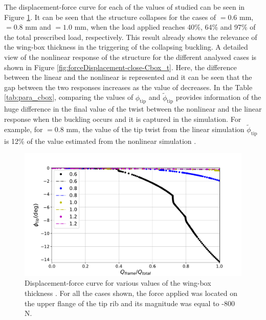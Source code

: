     The displacement-force curve for each of the values of \boxt studied can be seen in Figure \ref{fig:forceDisplacement-far-Cbox_t}. It can be seen that the structure collapses for the cases of \boxt$= 0.6$ mm, \boxt$= 0.8$ mm and \boxt$= 1.0$ mm, when the load applied reaches 40\%, 64\% and 97\% of the total prescribed load, respectively. This result already shows the relevance of the wing-box thickness \boxt in the triggering of the collapsing buckling. A detailed view of the nonlinear response of the structure for the different analysed cases is shown in Figure \ref{fig:forceDisplacement-close-Cbox_t}. Here, the difference between the linear and the nonlinear is represented and it can be seen that the gap between the two responses increases as the value of \boxt decreases. In the Table \ref{tab:para_cbox}, comparing the values of $\phi_{\mathrm{tip}}$ and $\tilde{\phi}_{\mathrm{tip}}$ provides information of the huge difference in the final value of the twist between the nonlinear and the linear response when the buckling occurs and it is captured in the simulation. For example, for \boxt$= 0.8$ mm, the value of the tip twist from the linear simulation $\tilde{\phi}_{\mathrm{tip}}$ is 12\% of the value estimated from the nonlinear simulation \phinonlin.

    \begin{figure}[!htpb] %
      \centering
      \includegraphics[width=0.8 \textwidth]{figures/result-sim/cbox/force_displacement-far}
      \caption[Displacement-force curve for various values of the wing-box thickness]{Displacement-force curve for various values of the wing-box thickness \boxt. For all the cases shown, the force applied was located on the upper flange of the tip rib and its magnitude was equal to -800 N.}\label{fig:forceDisplacement-far-Cbox_t}
    \end{figure}

